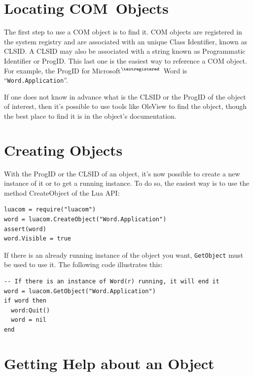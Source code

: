 \documentclass[11pt,a4paper,english]{report}
\newcommand{\ident}[1]{\mbox{\texttt{#1}}}
\newcommand{\techname}[1]{\mbox{#1}}
\newcommand{\com}{\techname{COM}}
\newcommand{\luacom}{\techname{LuaCOM}}
\newcommand{\registered}{$^{\textregistered}$}
\begin{document}

\section{Locating \com\ Objects}

The first step to use a COM object is to find it. COM objects are
registered in the system registry and are associated with an unique
Class Identifier, known as CLSID. A CLSID may also be associated with
a string known as Programmatic Identifier or ProgID. This last one is
the easiest way to reference a COM object. For example, the ProgID for
Microsoft\registered\ Word is ``\ident{Word.Application}''.

If one does not know in advance what is the CLSID or the ProgID of the
object of interest, then it's possible to use tools like OleView to
find the object, though the best place to find it is in the object's
documentation.


\section{Creating Objects}

With the ProgID or the CLSID of an object, it's now possible to create
a new instance of it or to get a running instance. To do so, the
easiest way is to use the method CreateObject of the Lua API:

\begin{verbatim}
luacom = require("luacom")
word = luacom.CreateObject("Word.Application")
assert(word)
word.Visible = true
\end{verbatim}

If there is an already running instance of the object you want,
\ident{GetObject} must be used to use it. The following code
illustrates this:

\begin{verbatim}
-- If there is an instance of Word(r) running, it will end it
word = luacom.GetObject("Word.Application")
if word then
  word:Quit()
  word = nil
end
\end{verbatim}

\section{Getting Help about an Object}
\end{document}
